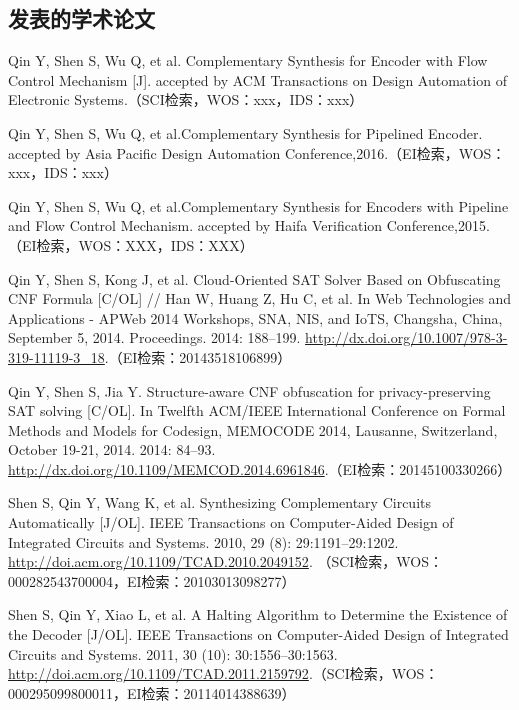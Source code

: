 \begin{resume}

  \section*{发表的学术论文} %

  \begin{enumerate}[{[}1{]}]
  \addtolength{\itemsep}{-.36\baselineskip}%
  \item Qin Y, Shen S, Wu Q, et al. Complementary Synthesis for Encoder with Flow
Control Mechanism [J]. accepted by ACM Transactions on Design Automation of
Electronic Systems.（SCI检索，WOS：xxx，IDS：xxx）

  \item Qin Y, Shen S, Wu Q, et al.Complementary Synthesis for Pipelined Encoder.
accepted by Asia Pacific Design Automation Conference,2016.（EI检索，WOS：xxx，IDS：xxx）

  \item Qin Y, Shen S, Wu Q, et al.Complementary Synthesis for Encoders with
Pipeline and Flow Control Mechanism.
accepted by Haifa Verification Conference,2015.（EI检索，WOS：XXX，IDS：XXX）

  \item Qin Y, Shen S, Kong J, et al. Cloud-Oriented SAT Solver Based on Obfuscating
CNF Formula [C/OL] // Han W, Huang Z, Hu C, et al. In Web Technologies and
Applications - APWeb 2014 Workshops, SNA, NIS, and IoTS, Changsha, China,
September 5, 2014. Proceedings. 2014: 188–199. \url{http://dx.doi.org/10.1007/978-3-319-11119-3_18}.（EI检索：20143518106899）

  \item Qin Y, Shen S, Jia Y. Structure-aware CNF obfuscation for privacy-preserving
SAT solving [C/OL]. In Twelfth ACM/IEEE International Conference on Formal
Methods and Models for Codesign, MEMOCODE 2014, Lausanne, Switzerland,
October 19-21, 2014. 2014: 84–93. \url{http://dx.doi.org/10.1109/MEMCOD.2014.6961846}.（EI检索：20145100330266）


  \item Shen S, Qin Y, Wang K, et al. Synthesizing Complementary Circuits Automatically
[J/OL]. IEEE Transactions on Computer-Aided Design of Integrated Circuits
and Systems. 2010, 29 (8): 29:1191–29:1202. \url{http://doi.acm.org/10.1109/TCAD.2010.2049152}. （SCI检索，WOS：000282543700004，EI检索：20103013098277）

  \item Shen S, Qin Y, Xiao L, et al. A Halting Algorithm to Determine the Existence of
the Decoder [J/OL]. IEEE Transactions on Computer-Aided Design of Integrated
Circuits and Systems. 2011, 30 (10): 30:1556–30:1563. \url{http://doi.acm.org/10.1109/TCAD.2011.2159792}.（SCI检索，WOS：000295099800011，EI检索：20114014388639）


\end{enumerate}
\end{resume}
